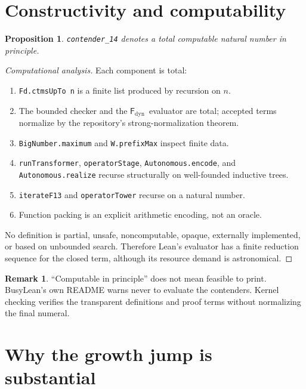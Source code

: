 \documentclass[11pt]{article}
\newtheorem{proposition}[theorem]{Proposition}
\theoremstyle{definition}
\newtheorem{remark}[theorem]{Remark}
\newcommand{\Fd}{\ensuremath{\mathsf{F}_{\mathrm{dyn}}}}
\newcommand{\lean}[1]{\texttt{#1}}
\begin{document}
\section{Constructivity and computability}

\begin{proposition}
\lean{contender\_14} denotes a total computable natural number in principle.
\end{proposition}
\begin{proof}[Computational analysis]
Each component is total:
\begin{enumerate}[label=(\arabic*)]
  \item \lean{Fd.ctmsUpTo n} is a finite list produced by recursion on $n$.
  \item The bounded checker and the \Fd\ evaluator are total; accepted terms
        normalize by the repository's strong-normalization theorem.
  \item \lean{BigNumber.maximum} and \lean{W.prefixMax} inspect finite data.
  \item \lean{runTransformer}, \lean{operatorStage}, \lean{Autonomous.encode},
        and \lean{Autonomous.realize} recurse structurally on well-founded
        inductive trees.
  \item \lean{iterateF13} and \lean{operatorTower} recurse on a natural number.
  \item Function packing is an explicit arithmetic encoding, not an oracle.
\end{enumerate}
No definition is partial, unsafe, noncomputable, opaque, externally
implemented, or based on unbounded search.  Therefore Lean's evaluator has a
finite reduction sequence for the closed term, although its resource demand is
astronomical.
\end{proof}

\begin{remark}
``Computable in principle'' does not mean feasible to print.  BusyLean's own
README warns never to evaluate the contenders.  Kernel checking verifies the
transparent definitions and proof terms without normalizing the final numeral.
\end{remark}

\section{Why the growth jump is substantial}
\end{document}
